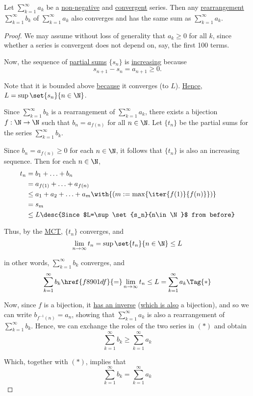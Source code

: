 \label{f6c27c0}

Let $\sum_{k=1}^\infty a_k$ be a \href{b6cffeb}{non-negative} and
\href{f8901df}{convergent} series. Then any \href{a58ff93}{rearrangement}
$\sum_{k=1}^\infty b_k$ of $\sum_{k=1}^\infty a_k$ also converges and has the
same sum as $\sum_{k=1}^\infty a_k$.

\begin{proof}
  We may assume without loss of generality that $a_k\geq0$ for all $k$, since
  whether a series is convergent does not depend on, say, the first 100 terms.

  Now, the sequence of \href{a835138}{partial sums} $\{s_n\}$ is
  \href{feae1b2}{increasing} because
  $$
    s_{n+1}-s_n=a_{n+1}\geq0.
  $$

  Note that it is bounded above \href{d8148e6}{because} it converges (to $L$).
  \href{c28d9a9}{Hence}, $L=\sup\set{s_n}{n\in\N}$.

  Since $\sum_{k=1}^\infty b_k$ is a rearrangement of $\sum_{k=1}^\infty a_k$,
  there exists a bijection $f:\N\to\N$ such that $b_n=a_{f(n)}$ for all
  $n\in\N$. Let $\{t_n\}$ be the partial sums for the series $\sum_{k=1}^\infty
  b_k$.

  Since $b_n=a_{f(n)}\geq0$ for each $n\in\N$, it follows that $\{t_n\}$ is
  also an increasing sequence. Then for each $n\in\N$,
  \begin{align*}
    t_n &=b_1+\ldots+b_n                                              \\
        &=a_{f(1)}+\ldots+a_{f(n)}                                    \\
        &\leq a_1+a_2+\ldots+a_m\with{(m:=\max\{\iter{f(1)}{f(n)}\})} \\
        &=s_m                                                         \\
        &\leq L\desc{Since $L=\sup\set{s_n}{n\in\N}$ from before}
  \end{align*}

  Thus, by the \href{cc11aa4}{MCT}, $\{t_n\}$ converges, and
  $$
    \lim_{n\to\infty}t_n=\sup\set{t_n}{n\in\N}\leq L
  $$

  in other words, $\sum_{k=1}^\infty b_k$ converges, and
  \begin{equation*}
    \sum_{k=1}^\infty b_k\href{f8901df}{=}\lim_{n\to\infty}t_n\leq L=\sum_{k=1}^\infty a_k\Tag{*}
  \end{equation*}

  Now, since $f$ is a bijection, it \href{b2530a8}{has an inverse}
  (\href{fb1a7df}{which is also} a bijection), and so we can write
  $b_{f^{-1}(n)}=a_{n}$, showing that $\sum_{k=1}^\infty a_k$ is also a
  rearrangement of $\sum_{k=1}^\infty b_k$. Hence, we can exchange the roles of
  the two series in $(*)$ and obtain
  $$
    \sum_{k=1}^\infty b_k\geq\sum_{k=1}^\infty a_k
  $$

  Which, together with $(*)$, implies that
  $$
    \sum_{k=1}^\infty b_k=\sum_{k=1}^\infty a_k
  $$
\end{proof}

